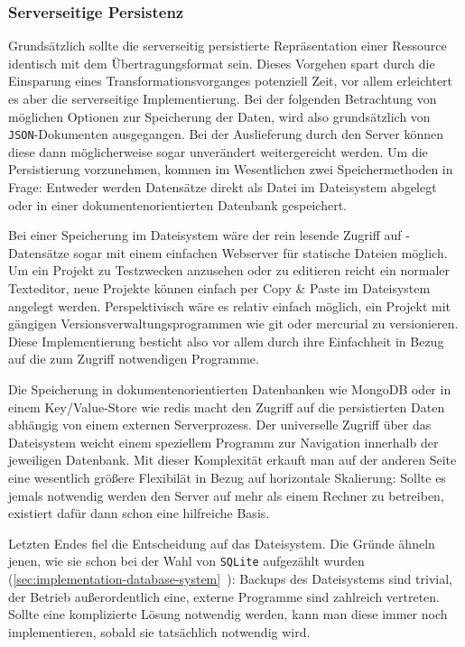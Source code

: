 \subsubsection{Serverseitige Persistenz}
\label{sec:implementation-persistence}

Grundsätzlich sollte die serverseitig persistierte Repräsentation einer Ressource identisch mit dem Übertragungsformat sein. Dieses Vorgehen spart durch die Einsparung eines Transformationsvorganges potenziell Zeit, vor allem erleichtert es aber die serverseitige Implementierung. Bei der folgenden Betrachtung von möglichen Optionen zur Speicherung der Daten, wird also grundsätzlich von \texttt{JSON}-Dokumenten ausgegangen. Bei der Auslieferung durch den Server können diese dann möglicherweise sogar unverändert weitergereicht werden. Um die Persistierung vorzunehmen, kommen im Wesentlichen zwei Speichermethoden in Frage: Entweder werden Datensätze direkt als Datei im Dateisystem abgelegt oder in einer dokumentenorientierten Datenbank gespeichert.

Bei einer Speicherung im Dateisystem wäre der rein lesende Zugriff auf \idename-Datensätze sogar mit einem einfachen Webserver für statische Dateien möglich. Um ein Projekt zu Testzwecken anzusehen oder zu editieren reicht ein normaler Texteditor, neue Projekte können einfach per Copy \& Paste im Dateisystem angelegt werden. Perspektivisch wäre es relativ einfach möglich, ein Projekt mit gängigen Versionsverwaltungsprogrammen wie git oder mercurial zu versionieren. Diese Implementierung besticht also vor allem durch ihre Einfachheit in Bezug auf die zum Zugriff notwendigen Programme.

Die Speicherung in dokumentenorientierten Datenbanken wie MongoDB oder in einem Key/Value-Store wie redis macht den Zugriff auf die persistierten Daten abhängig von einem externen Serverprozess. Der universelle Zugriff über das Dateisystem weicht einem speziellem Programm zur Navigation innerhalb der jeweiligen Datenbank. Mit dieser Komplexität erkauft man auf der anderen Seite eine wesentlich größere Flexibilät in Bezug auf horizontale Skalierung: Sollte es jemals notwendig werden den Server auf mehr als einem Rechner zu betreiben, existiert dafür dann schon eine hilfreiche Basis.

Letzten Endes fiel die Entscheidung auf das Dateisystem. Die Gründe ähneln jenen, wie sie schon bei der Wahl von \texttt{SQLite} aufgezählt wurden (\ref{sec:implementation-database-system}~): Backups des Dateisystems sind trivial, der Betrieb außerordentlich eine, externe Programme sind zahlreich vertreten. Sollte eine komplizierte Lösung notwendig werden, kann man diese immer noch implementieren, sobald sie tatsächlich notwendig wird.

